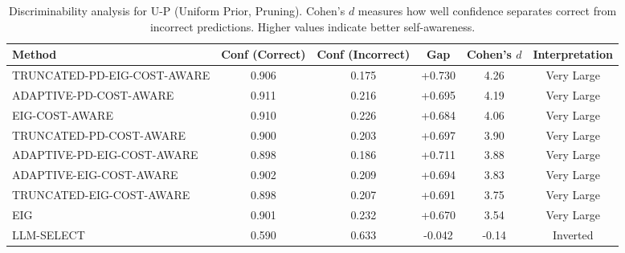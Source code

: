 \begin{table}[htbp]
\centering
\small
\caption{Discriminability analysis for U-P (Uniform Prior, Pruning). Cohen's $d$ measures how well confidence separates correct from incorrect predictions. Higher values indicate better self-awareness.}
\label{tab:discriminability-prune_uniform}
\begin{tabular}{@{}lccccc@{}}
\toprule
Method & Conf (Correct) & Conf (Incorrect) & Gap & Cohen's $d$ & Interpretation \\
\midrule
TRUNCATED-PD-EIG-COST-AWARE & 0.906 & 0.175 & +0.730 & 4.26 & Very Large \\
ADAPTIVE-PD-COST-AWARE & 0.911 & 0.216 & +0.695 & 4.19 & Very Large \\
EIG-COST-AWARE & 0.910 & 0.226 & +0.684 & 4.06 & Very Large \\
TRUNCATED-PD-COST-AWARE & 0.900 & 0.203 & +0.697 & 3.90 & Very Large \\
ADAPTIVE-PD-EIG-COST-AWARE & 0.898 & 0.186 & +0.711 & 3.88 & Very Large \\
ADAPTIVE-EIG-COST-AWARE & 0.902 & 0.209 & +0.694 & 3.83 & Very Large \\
TRUNCATED-EIG-COST-AWARE & 0.898 & 0.207 & +0.691 & 3.75 & Very Large \\
EIG & 0.901 & 0.232 & +0.670 & 3.54 & Very Large \\
LLM-SELECT & 0.590 & 0.633 & -0.042 & -0.14 & Inverted \\
\bottomrule
\end{tabular}
\end{table}